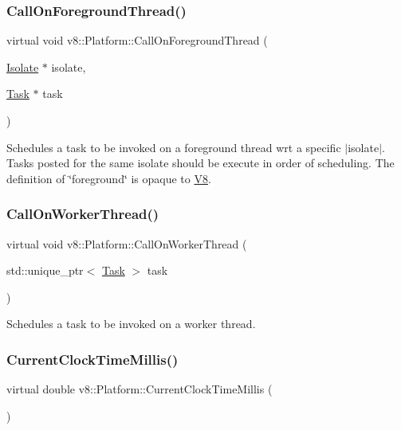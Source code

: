 \subsubsection{\texorpdfstring{Call\+On\+Foreground\+Thread()}{CallOnForegroundThread()}}
{\footnotesize\ttfamily virtual void v8\+::\+Platform\+::\+Call\+On\+Foreground\+Thread (\begin{DoxyParamCaption}\item[{\mbox{\hyperlink{classv8_1_1Isolate}{Isolate}} $\ast$}]{isolate,  }\item[{\mbox{\hyperlink{classv8_1_1Task}{Task}} $\ast$}]{task }\end{DoxyParamCaption})\hspace{0.3cm}{\ttfamily [pure virtual]}}

Schedules a task to be invoked on a foreground thread wrt a specific $\vert$isolate$\vert$. Tasks posted for the same isolate should be execute in order of scheduling. The definition of \char`\"{}foreground\char`\"{} is opaque to \mbox{\hyperlink{classv8_1_1V8}{V8}}. \mbox{\label{classv8_1_1Platform_a92dc9c2f54c9a0fea87e15df8d58d699}} 
\subsubsection{\texorpdfstring{Call\+On\+Worker\+Thread()}{CallOnWorkerThread()}}
{\footnotesize\ttfamily virtual void v8\+::\+Platform\+::\+Call\+On\+Worker\+Thread (\begin{DoxyParamCaption}\item[{std\+::unique\+\_\+ptr$<$ \mbox{\hyperlink{classv8_1_1Task}{Task}} $>$}]{task }\end{DoxyParamCaption})\hspace{0.3cm}{\ttfamily [pure virtual]}}

Schedules a task to be invoked on a worker thread. \mbox{\label{classv8_1_1Platform_a8aa46c7f8e492351ebe1bc8168ec9c2f}} 
\subsubsection{\texorpdfstring{Current\+Clock\+Time\+Millis()}{CurrentClockTimeMillis()}}
{\footnotesize\ttfamily virtual double v8\+::\+Platform\+::\+Current\+Clock\+Time\+Millis (\begin{DoxyParamCaption}{ }\end{DoxyParamCaption})\hspace{0.3cm}{\ttfamily [pure virtual]}}

